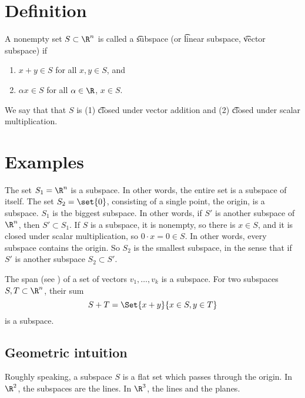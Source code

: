 
\section*{Definition}

A nonempty set $S \subset \R ^n$ is called a \t{subspace} (or \t{linear subspace}, \t{vector subspace}) if
    \begin{enumerate}
      \item $x + y \in S$ for all $x, y \in S$, and
      \item $\alpha x \in S$ for all $\alpha  \in \R $, $x \in S$.
    \end{enumerate}
We say that that $S$ is (1) \t{closed under vector addition} and (2) \t{closed under scalar multiplication}.

\section*{Examples}

The set $S_1 = \R ^n$ is a subspace. In other words, the entire set is a subspace of itself.
The set $S_2 = \set{0}$, consisting of a single point, the origin, is a subspace.
$S_1$ is the biggest subspace.
In other words, if $S'$ is another subspace of $\R ^n$, then $S' \subset S_1$.
If $S$ is a subspace, it is nonempty, so there is $x \in S$, and it is closed under scalar multiplication, so $0\cdot x = 0 \in S$.
In other words, every subspace contains the origin.
So $S_2$ is the smallest subspace, in the sense that if $S'$ is another subspace $S_2 \subset S'$.

The span (see ) of a set of vectors $v_1, \dots , v_k$ is a subspace.
For two subspaces $S, T \subset \R ^n$, their sum
\[
S + T = \Set{x + y}{x \in S, y \in T}
\]
is a subspace.

\subsection*{Geometric intuition}

Roughly speaking, a subspace $S$ is a flat set which passes through the origin.
In $\R ^2$, the subspaces are the lines.
In $\R ^3$, the lines and the planes.

\blankpage